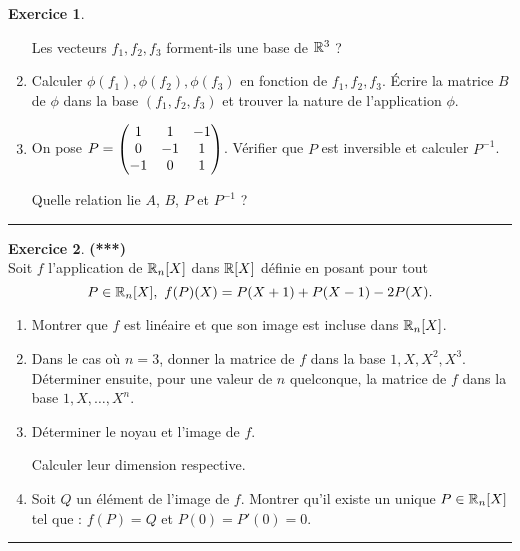 \documentclass[a4paper,11pt]{article}
\theoremstyle{definition}
\newtheorem{exo}{Exercice} %
\begin{document}
\begin{minipage}{1\linewidth}
\begin{minipage}[t]{0.48\linewidth}
\begin{exo}
\begin{enumerate}
				
				Les vecteurs $f_1,f_2,f_3$ forment-ils une base de $\mathbb{R}^3$ ?
				
				\item Calculer $\phi(f_1), \phi(f_2), \phi(f_3)$ en fonction de $f_1,f_2,f_3$.
				Écrire la matrice $B$ de $\phi$ dans la base $(f_1,f_2,f_3)$ et trouver la nature
				de l'application $\phi$.
				
				\item On pose $P=\begin{pmatrix}1&1&-1\cr 0&-1&1\cr-1&0&1\cr\end{pmatrix}$. Vérifier que $P$ est
				inversible et calculer $P^{-1}$.
				
				Quelle relation lie $A$, $B$, $P$ et $P^{-1}$ ?
			\end{enumerate}
			
			\centering\rule{1\linewidth}{0.6pt}\end{exo}
		
		
		\begin{exo}\textbf{(***)}\quad\\[0.2cm]
			Soit $f$ l'application de $\mathbb{R}_n[X]$  dans  $\mathbb{R}[X]$
			définie en posant pour tout  
			$$P\in \R_n[X],\ f(P)(X)=P(X+1)+P(X-1)-2P(X).$$
			\begin{enumerate}
				\item Montrer que  $f$  est linéaire et que son image est
				incluse dans  $\mathbb{R}_n[X]$.
				\item Dans le cas o\`u  $n=3$, donner la matrice de  $f$  dans
				la base  $1,X, X^2, X^3$. Déterminer ensuite, pour une valeur de  $n$
				quelconque, la matrice de  $f$  dans la base  $1,X,\ldots,X^n$.
				\item Déterminer le noyau et l'image de  $f$. 
				
				Calculer leur dimension respective.
				\item Soit  $Q$  un élément de l'image de  $f$.
				Montrer qu'il existe un unique  $P\in \mathbb{R}_n[X]$
				tel que : $f(P)=Q$  et  $P(0)=P'(0)=0$.
			\end{enumerate}	
			
			\centering\rule{1\linewidth}{0.6pt}\end{exo}
		
		
		
		
\end{minipage}\end{minipage}\newpage
\end{document}

